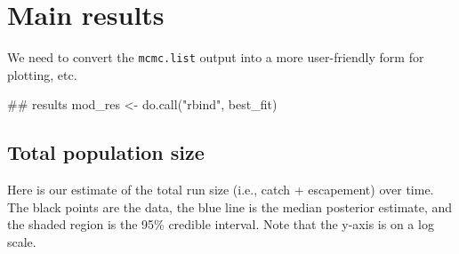 \documentclass[11pt,]{article}
\newenvironment{Shaded}{}{}
\newcommand{\CommentTok}[1]{\textcolor[rgb]{0.00,0.50,0.00}{#1}}
\newcommand{\KeywordTok}[1]{\textcolor[rgb]{0.00,0.00,1.00}{#1}}
\newcommand{\NormalTok}[1]{#1}
\newcommand{\StringTok}[1]{\textcolor[rgb]{0.00,0.50,0.50}{#1}}
\begin{document}
\hypertarget{main-results}{%
\section{Main results}\label{main-results}}

We need to convert the \texttt{mcmc.list} output into a more
user-friendly form for plotting, etc.

\begin{Shaded}
\begin{Highlighting}[]
\CommentTok{## results}
\NormalTok{mod_res <-}\StringTok{ }\KeywordTok{do.call}\NormalTok{(}\StringTok{"rbind"}\NormalTok{, best_fit)}
\end{Highlighting}
\end{Shaded}

\hypertarget{total-population-size}{%
\subsection{Total population size}\label{total-population-size}}

Here is our estimate of the total run size (i.e., catch + escapement)
over time. The black points are the data, the blue line is the median
posterior estimate, and the shaded region is the 95\% credible interval.
Note that the y-axis is on a log scale.
\end{document}
